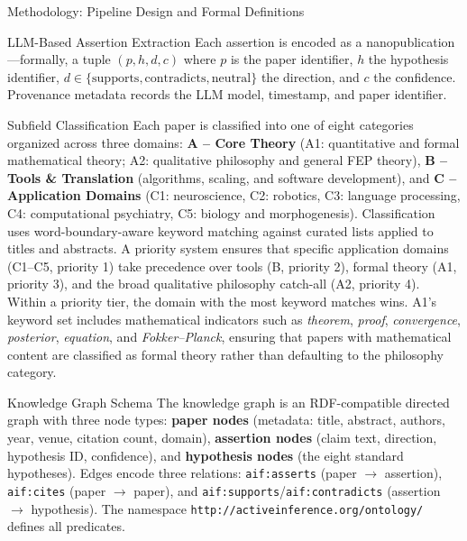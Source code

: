 \documentclass[
  ignorenonframetext,
]{beamer}
\begin{document}
\begin{frame}[fragile]{Methodology: Pipeline Design and Formal
Definitions}
\begin{block}{LLM-Based Assertion Extraction}
Each assertion is encoded as a nanopublication
\citep{groth2010anatomy, kuhn2016decentralized}---formally, a tuple
\((p, h, d, c)\) where \(p\) is the paper identifier, \(h\) the
hypothesis identifier,
\(d \in \{\text{supports}, \text{contradicts}, \text{neutral}\}\) the
direction, and \(c\) the confidence. Provenance metadata records the LLM
model, timestamp, and paper identifier.
\end{block}

\begin{block}{Subfield Classification}
\protect{}\label{subfield-classification}
Each paper is classified into one of eight categories organized across
three domains: \textbf{A -- Core Theory} (A1: quantitative and formal
mathematical theory; A2: qualitative philosophy and general FEP theory),
\textbf{B -- Tools \& Translation} (algorithms, scaling, and software
development), and \textbf{C -- Application Domains} (C1: neuroscience,
C2: robotics, C3: language processing, C4: computational psychiatry, C5:
biology and morphogenesis). Classification uses word-boundary-aware
keyword matching against curated lists applied to titles and abstracts.
A priority system ensures that specific application domains (C1--C5,
priority 1) take precedence over tools (B, priority 2), formal theory
(A1, priority 3), and the broad qualitative philosophy catch-all (A2,
priority 4). Within a priority tier, the domain with the most keyword
matches wins. A1's keyword set includes mathematical indicators such as
\emph{theorem}, \emph{proof}, \emph{convergence}, \emph{posterior},
\emph{equation}, and \emph{Fokker--Planck}, ensuring that papers with
mathematical content are classified as formal theory rather than
defaulting to the philosophy category.
\end{block}

\begin{block}{Knowledge Graph Schema}
\protect{}\label{knowledge-graph-schema}
The knowledge graph is an RDF-compatible directed graph with three node
types: \textbf{paper nodes} (metadata: title, abstract, authors, year,
venue, citation count, domain), \textbf{assertion nodes} (claim text,
direction, hypothesis ID, confidence), and \textbf{hypothesis nodes}
(the eight standard hypotheses). Edges encode three relations:
\texttt{aif:asserts} (paper \(\to\) assertion), \texttt{aif:cites}
(paper \(\to\) paper), and
\texttt{aif:supports}/\texttt{aif:contradicts} (assertion \(\to\)
hypothesis). The namespace \texttt{http://activeinference.org/ontology/}
defines all predicates.


\end{block}
\end{frame}
\end{document}
